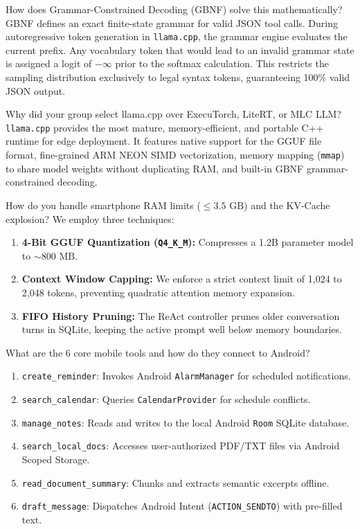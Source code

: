 \documentclass[11pt,a4paper]{article}
\begin{document}
\begin{qabox}{How does Grammar-Constrained Decoding (GBNF) solve this mathematically?}
GBNF defines an exact finite-state grammar for valid JSON tool calls. During autoregressive token generation in \texttt{llama.cpp}, the grammar engine evaluates the current prefix. Any vocabulary token that would lead to an invalid grammar state is assigned a logit of $-\infty$ prior to the softmax calculation. This restricts the sampling distribution exclusively to legal syntax tokens, guaranteeing 100\% valid JSON output.
\end{qabox}

\begin{qabox}{Why did your group select llama.cpp over ExecuTorch, LiteRT, or MLC LLM?}
\texttt{llama.cpp} provides the most mature, memory-efficient, and portable C++ runtime for edge deployment. It features native support for the GGUF file format, fine-grained ARM NEON SIMD vectorization, memory mapping (\texttt{mmap}) to share model weights without duplicating RAM, and built-in GBNF grammar-constrained decoding.
\end{qabox}

\begin{qabox}{How do you handle smartphone RAM limits ($\le 3.5\text{ GB}$) and the KV-Cache explosion?}
We employ three techniques:
\begin{enumerate}[leftmargin=*]
  \item \textbf{4-Bit GGUF Quantization (\texttt{Q4\_K\_M}):} Compresses a 1.2B parameter model to $\sim 800\text{ MB}$.
  \item \textbf{Context Window Capping:} We enforce a strict context limit of 1,024 to 2,048 tokens, preventing quadratic attention memory expansion.
  \item \textbf{FIFO History Pruning:} The ReAct controller prunes older conversation turns in SQLite, keeping the active prompt well below memory boundaries.
\end{enumerate}
\end{qabox}

\begin{qabox}{What are the 6 core mobile tools and how do they connect to Android?}
\begin{enumerate}[leftmargin=*]
  \item \texttt{create\_reminder}: Invokes Android \texttt{AlarmManager} for scheduled notifications.
  \item \texttt{search\_calendar}: Queries \texttt{CalendarProvider} for schedule conflicts.
  \item \texttt{manage\_notes}: Reads and writes to the local Android \texttt{Room} SQLite database.
  \item \texttt{search\_local\_docs}: Accesses user-authorized PDF/TXT files via Android Scoped Storage.
  \item \texttt{read\_document\_summary}: Chunks and extracts semantic excerpts offline.
  \item \texttt{draft\_message}: Dispatches Android Intent (\texttt{ACTION\_SENDTO}) with pre-filled text.
\end{enumerate}
\end{qabox}
\end{document}
